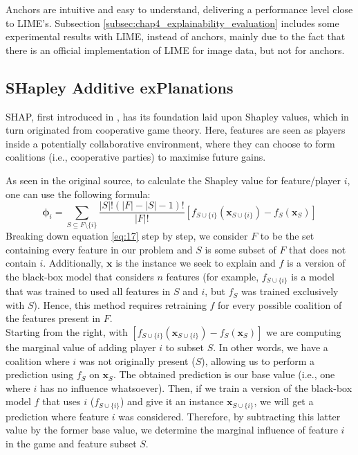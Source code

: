 Anchors are intuitive and easy to understand, delivering a performance level close to \ac{LIME}'s. Subsection \ref{subsec:chap4_explainability_evaluation} includes some experimental results with \ac{LIME}, instead of anchors, mainly due to the fact that there is an official implementation of \ac{LIME} for image data, but not for anchors.

\subsection{SHapley Additive exPlanations}
\label{subsec:chap2_shapley_additive_explanations}
\ac{SHAP}, first introduced in \cite{shap}, has its foundation laid upon Shapley values, which in turn originated from cooperative game theory. Here, features are seen as players inside a potentially collaborative environment, where they can choose to form coalitions (i.e., cooperative parties) to maximise future gains. 

As seen in the original source, to calculate the Shapley value for feature/player $i$, one can use the following formula:
\begin{equation}
    \boldsymbol{\phi}_{i} = \sum_{S \subseteq F \setminus \{i\}} \frac{|S|!(|F| - |S| - 1)!}{|F|!}[f_{S \cup \{i\}}(\mathbf{x}_{S \cup \{i\}}) - f_{S}(\mathbf{x}_{S})]
    \label{eq:17}
\end{equation}
Breaking down equation \ref{eq:17} step by step, we consider $F$ to be the set containing every feature in our problem and $S$ is some subset of $F$ that does not contain $i$. Additionally, $\mathbf{x}$ is the instance we seek to explain and $f$ is a version of the black-box model that considers $n$ features (for example, $f_{S \cup \{i\}}$ is a model that was trained to used all features in $S$ and $i$, but $f_{S}$ was trained exclusively with $S$). Hence, this method requires retraining $f$ for every possible coalition of the features present in $F$.\\

Starting from the right, with $[f_{S \cup \{i\}}(\mathbf{x}_{S \cup \{i\}}) - f_{S}(\mathbf{x}_{S})]$ we are computing the marginal value of adding player $i$ to subset $S$. In other words, we have a coalition where $i$ was not originally present ($S$), allowing us to perform a prediction using $f_{S}$ on $\mathbf{x}_{S}$. The obtained prediction is our base value (i.e., one where $i$ has no influence whatsoever). Then, if we train a version of the black-box model $f$ that uses $i$ ($f_{S \cup \{i\}}$) and give it an instance $\mathbf{x}_{S \cup \{i\}}$, we will get a prediction where feature $i$ was considered. Therefore, by subtracting this latter value by the former base value, we determine the marginal influence of feature $i$ in the game and feature subset $S$. 

